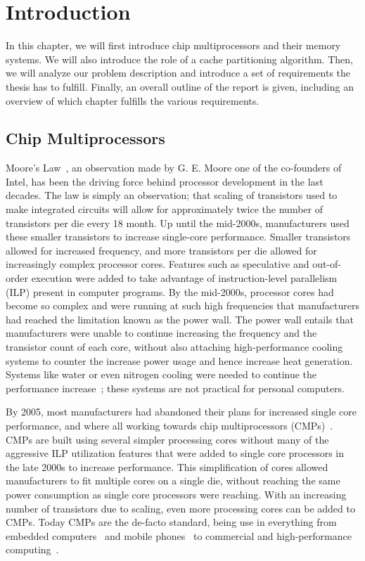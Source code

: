 \chapter{Introduction}
\label{cpt:introduction}

In this chapter, we will first introduce chip multiprocessors and their memory systems.
We will also introduce the role of a cache partitioning algorithm.
Then, we will analyze our problem description and introduce a set of requirements the thesis has to fulfill.
Finally, an overall outline of the report is given, including an overview of which chapter fulfills the various requirements.

\section{Chip Multiprocessors}

Moore's Law~\cite{Moore1998}, an observation made by G. E. Moore one of the co-founders of Intel, has been the driving force behind processor development in the last decades.
The law is simply an observation; that scaling of transistors used to make integrated circuits will allow for approximately twice the number of transistors per die every 18 month.
Up until the mid-2000s, manufacturers used these smaller transistors to increase single-core performance.
Smaller transistors allowed for increased frequency, and more transistors per die allowed for increasingly complex processor cores.
Features such as speculative and out-of-order execution were added to take advantage of instruction-level parallelism (ILP) present in computer programs.
By the mid-2000s, processor cores had become so complex and were running at such high frequencies that manufacturers had reached the limitation known as the power wall.
The power wall entails that manufacturers were unable to continue increasing the frequency and the transistor count of each core, without also attaching high-performance cooling systems to counter the increase power usage and hence increase heat generation.
Systems like water or even nitrogen cooling were needed to continue the performance increase~\cite{Sutter2005}; these systems are not practical for personal computers.

By 2005, most manufacturers had abandoned their plans for increased single core performance, and where all working towards chip multiprocessors (CMPs)~\cite{Sutter2005}.
CMPs are built using several simpler processing cores without many of the aggressive ILP utilization features that were added to single core processors in the late 2000s to increase performance.
This simplification of cores allowed manufacturers to fit multiple cores on a single die, without reaching the same power consumption as single core processors were reaching.
With an increasing number of transistors due to scaling, even more processing cores can be added to CMPs.
Today CMPs are the de-facto standard, being use in everything from embedded computers~\cite{ARM2010} and mobile phones~\cite{Ho2014} to commercial and high-performance computing~\cite{Thomadakis2011, Jain2013}.


